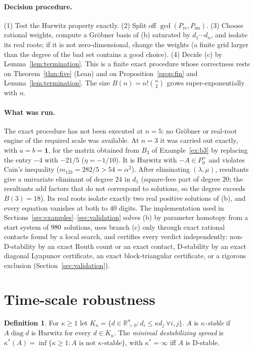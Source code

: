 \documentclass[11pt,a4paper]{article}
\theoremstyle{plain}
\theoremstyle{definition}
\newtheorem{definition}[theorem]{Definition}
\newcommand{\R}{\mathbb{R}}
\newcommand{\Rp}{\R^n_{>0}}
\newcommand{\diag}{\operatorname{diag}}
\newcommand{\Pre}{P_{\mathrm{re}}}
\newcommand{\Pim}{P_{\mathrm{im}}}
\newcommand{\Kk}{K_\kappa}
\newcommand{\ks}{\kappa^{*}}
\begin{document}
\paragraph{Decision procedure.} (1) Test the Hurwitz property exactly. (2) Split off $\gcd(\Pre,\Pim)$.
(3) Choose rational weights, compute a Gr\"obner basis of (b) saturated by $d_1\cdots d_n$, and isolate its real
roots; if it is not zero-dimensional, change the weights (a finite grid larger than the degree of the bad set
contains a good choice). (4) Decide (c) by Lemma~\ref{lem:termination}. This is a finite exact procedure whose
correctness rests on Theorem~\ref{thm:five} (Lean) and on Proposition~\ref{prop:fin} and
Lemma~\ref{lem:termination}. The size $B(n)=n!\binom n2$ grows super-exponentially with $n$.

\paragraph{What was run.} The exact procedure has not been executed at $n=5$: no Gr\"obner or real-root engine
of the required scale was available. At $n=3$ it was carried out exactly, with $a=b=\mathbf 1$, for the
matrix obtained from $B_3$ of Example~\ref{ex:b3} by replacing the entry $-4$ with $-21/5$ ($\eta=-1/10$). It is Hurwitz
with $-A\in P_0^+$ and violates Cain's inequality ($m_{123}=282/5>54=\alpha^2$). After eliminating $(\lambda,\mu)$,
resultants give a univariate eliminant of degree $24$ in $d_1$ (square-free part of degree $20$; the resultants add
factors that do not correspond to solutions, so the degree exceeds $B(3)=18$). Its real roots isolate exactly two
real positive solutions of (b), and every equation vanishes at both to 40 digits. The implementation used in
Sections~\ref{sec:examples}--\ref{sec:validation} solves (b) by parameter homotopy from a start system of $980$
solutions, uses branch (c) only through exact rational contacts found by a local search, and certifies every
verdict independently: non-D-stability by an exact Routh count or an exact contact, D-stability by an exact
diagonal Lyapunov certificate, an exact block-triangular certificate, or a rigorous exclusion
(Section~\ref{sec:validation}).

\section{Time-scale robustness}\label{sec:time}

\begin{definition}\label{def:cone}
For $\kappa\ge1$ let $\Kk=\{d\in\Rp:d_i\le\kappa d_j\ \forall i,j\}$. $A$ is \emph{$\kappa$-stable} if
$A\diag d$ is Hurwitz for every $d\in\Kk$. The \emph{minimal destabilizing spread} is
$\ks(A)=\inf\{\kappa\ge1:A\text{ is not }\kappa\text{-stable}\}$, with $\ks=\infty$ iff $A$ is D-stable.
\end{definition}
\end{document}
